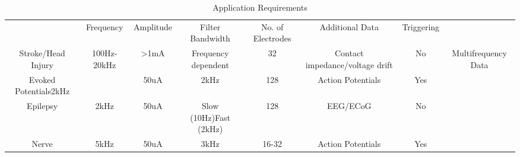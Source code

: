 \begin{table} 
    \begin{tabular}{ c c c c c c c c }
         & Frequency & Amplitude & Filter Bandwidth & No. of Electrodes & Additional Data & Triggering &  \\ 
        Stroke/Head Injury & 100Hz-20kHz & >1mA & Frequency dependent & 32 & Contact impedance/voltage drift & No & Multifrequency Data \\ 
        Evoked Potentials2kHz &  & 50uA & 2kHz & 128 & Action Potentials & Yes &  \\ 
        Epilepsy & 2kHz & 50uA & Slow (10Hz)Fast (2kHz) & 128 & EEG/ECoG & No &  \\ 
        Nerve & 5kHz & 50uA & 3kHz & 16-32 & Action Potentials & Yes &  \\ 
    \end{tabular} 
    \caption{Application Requirements} 
\end{table}